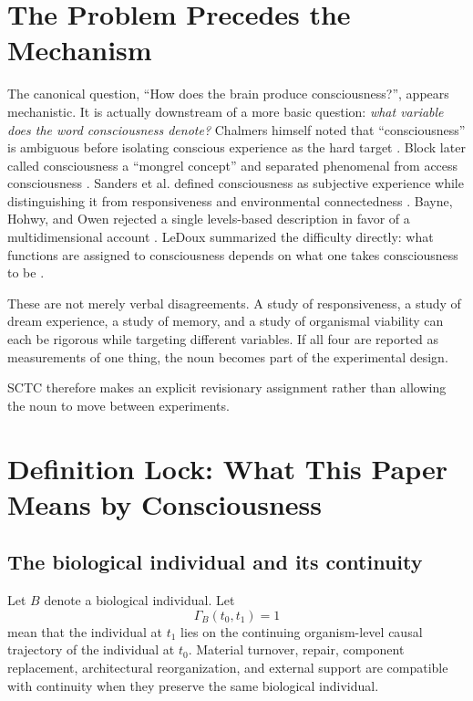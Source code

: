 \section{The Problem Precedes the Mechanism}
The canonical question, ``How does the brain produce consciousness?'', appears mechanistic. It is actually downstream of a more basic question: \emph{what variable does the word consciousness denote?} Chalmers himself noted that ``consciousness'' is ambiguous before isolating conscious experience as the hard target \cite{Chalmers1995}. Block later called consciousness a ``mongrel concept'' and separated phenomenal from access consciousness \cite{Block1995}. Sanders et al. defined consciousness as subjective experience while distinguishing it from responsiveness and environmental connectedness \cite{Sanders2012}. Bayne, Hohwy, and Owen rejected a single levels-based description in favor of a multidimensional account \cite{Bayne2016}. LeDoux summarized the difficulty directly: what functions are assigned to consciousness depends on what one takes consciousness to be \cite{LeDoux2025}.

These are not merely verbal disagreements. A study of responsiveness, a study of dream experience, a study of memory, and a study of organismal viability can each be rigorous while targeting different variables. If all four are reported as measurements of one thing, the noun becomes part of the experimental design.


SCTC therefore makes an explicit revisionary assignment rather than allowing the noun to move between experiments.

\section{Definition Lock: What This Paper Means by Consciousness}
\subsection{The biological individual and its continuity}
Let $B$ denote a biological individual. Let
\begin{equation}
\Gamma_B(t_0,t_1)=1
\end{equation}
mean that the individual at $t_1$ lies on the continuing organism-level causal trajectory of the individual at $t_0$. Material turnover, repair, component replacement, architectural reorganization, and external support are compatible with continuity when they preserve the same biological individual.

